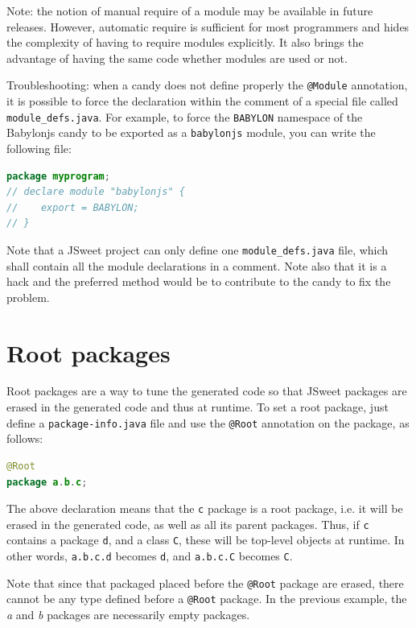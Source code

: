 \documentclass[a4paper]{report}
\begin{document}
Note: the notion of manual require of a module may be available in future releases. However, automatic require is sufficient for most programmers and hides the complexity of having to require modules explicitly. It also brings the advantage of having the same code whether modules are used or not.

Troubleshooting: when a candy does not define properly the \texttt{@Module} annotation, it is possible to force the declaration within the comment of a special file called \texttt{module\_defs.java}. For example, to force the \texttt{BABYLON} namespace of the Babylonjs candy to be exported as a \texttt{babylonjs} module, you can write the following file:

\begin{lstlisting}[language=Java]
package myprogram;
// declare module "babylonjs" {
//    export = BABYLON;
// } 
\end{lstlisting}

Note that a JSweet project can only define one \texttt{module\_defs.java} file, which shall contain all the module declarations in a comment. Note also that it is a hack and the preferred method would be to contribute to the candy to fix the problem.

\section{Root packages}

Root packages are a way to tune the generated code so that JSweet packages are erased in the generated code and thus at runtime. To set a root package, just define a \texttt{package-info.java} file and use the \texttt{@Root} annotation on the package, as follows:

\begin{lstlisting}[language=Java]
@Root
package a.b.c;
\end{lstlisting}

The above declaration means that the \texttt{c} package is a root package, i.e. it will be erased in the generated code, as well as all its parent packages. Thus, if \texttt{c} contains a package \texttt{d}, and a class \texttt{C}, these will be top-level objects at runtime. In other words, \texttt{a.b.c.d} becomes \texttt{d}, and \texttt{a.b.c.C} becomes \texttt{C}.

Note that since that packaged placed before the \texttt{@Root} package are erased, there cannot be any type defined before a \texttt{@Root} package. In the previous example, the \emph{a} and \emph{b} packages are necessarily empty packages.
\end{document}
